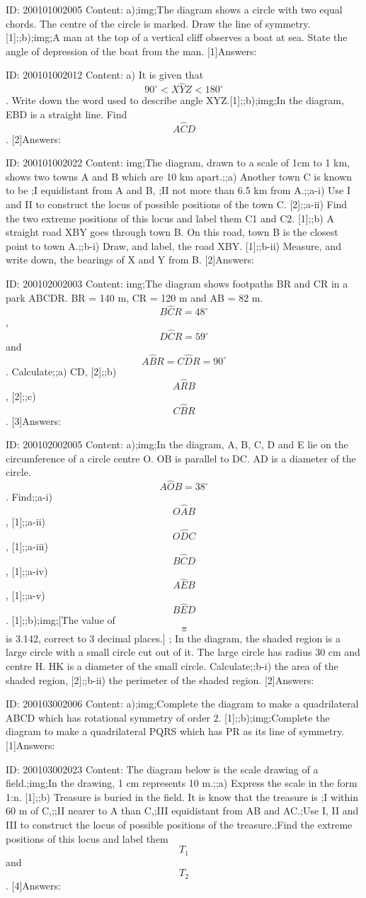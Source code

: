 \documentclass{article}
\begin{document}
ID: 200101002005
Content:
a);img;The diagram shows a circle with two equal chords. The centre of the circle is marked. Draw the line of symmetry. [1];;b);img;A man at the top of a vertical cliff observes a boat at sea. State the angle of depression of the boat from the man. [1]Answers:

ID: 200101002012
Content:
a) It is given that $$90^{\circ}<X \hat YZ<180^{\circ}$$. Write down the word used to describe angle XYZ.[1];;b);img;In the diagram, EBD is a straight line. Find $$A \hat CD$$. [2]Answers:

ID: 200101002022
Content:
img;The diagram, drawn to a scale of 1cm to 1 km, shows two towns A and B which are 10 km apart.;;a) Another town C is known to be ;I	equidistant from A and B, ;II	not more than 6.5 km from A.;;a-i) Use I and II to construct the locus of possible positions of the town C. [2];;a-ii) Find the two extreme positions of this locus and label them C1 and C2. [1];;b) A straight road XBY goes through town B. On this road, town B is the closest point to town A.;;b-i) Draw, and label, the road XBY. [1];;b-ii) Measure, and write down, the bearings of X and Y from B. [2]Answers:

ID: 200102002003
Content:
img;The diagram shows footpaths BR and CR in a park ABCDR. BR = 140 m, CR = 120 m and AB = 82 m. $$B \hat CR=48^{\circ}$$, $$D \hat CR=59^{\circ}$$ and $$A \hat BR=C \hat DR=90^{\circ}$$. Calculate;;a) CD, [2];;b) $$A \hat RB$$, [2];;c) $$C \hat BR$$. [3]Answers:

ID: 200102002005
Content:
a);img;In the diagram, A, B, C, D and E lie on the circumference of a circle centre O. OB is parallel to DC. AD is a diameter of the circle. $$A \hat OB=38^{\circ}$$. Find;;a-i) $$O \hat AB$$, [1];;a-ii) $$O \hat DC$$, [1];;a-iii) $$B \hat CD$$, [1];;a-iv) $$A \hat EB$$, [1];;a-v) $$B \hat ED$$. [1];;b);img;[The value of $$\pi$$ is 3.142, correct to 3 decimal places.] ; In the diagram, the shaded region is a large circle with a small circle cut out of it. The large circle has radius 30 cm and centre H. HK is a diameter of the small circle. Calculate;;b-i) the area of the shaded region, [2];;b-ii) the perimeter of the shaded region. [2]Answers:

ID: 200103002006
Content:
a);img;Complete the diagram to make a quadrilateral ABCD which has rotational symmetry of order 2. [1];;b);img;Complete the diagram to make a quadrilateral PQRS which has PR as its line of symmetry. [1]Answers:

ID: 200103002023
Content:
The diagram below is the scale drawing of a field.;img;In the drawing, 1 cm represents 10 m.;;a) Express the scale in the form 1:n.    [1];;b) Treasure is buried in the field. It is know that the treasure is ;I	within 60 m of C,;;II	nearer to A than C,;III	equidistant from AB and AC.;Use I, II and III to construct the locus of possible positions of the treasure.;Find the extreme positions of this locus and label them $$T_1$$ and $$T_2$$.    [4]Answers:
\end{document}
